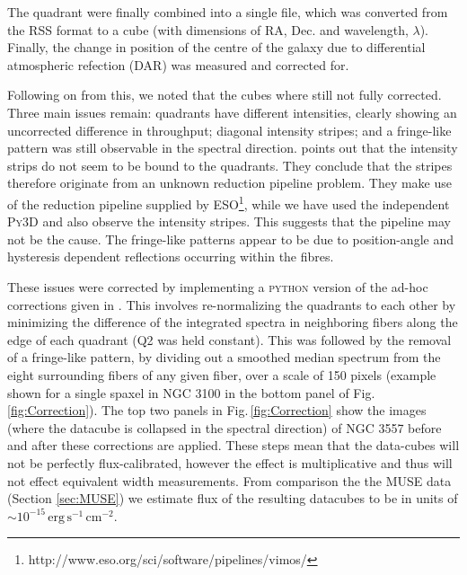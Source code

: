 		The quadrant were finally combined into a single file, which was converted from the RSS format to a cube (with dimensions of RA, Dec. and wavelength, $\lambda$). Finally, the change in position of the centre of the galaxy due to differential atmospheric refection (DAR) was measured and corrected for. 

		Following on from this, we noted that the cubes where still not fully corrected. Three main issues remain: quadrants have different intensities, clearly showing an uncorrected difference in throughput; diagonal intensity stripes; and a fringe-like pattern was still observable in the spectral direction. \citet{Lagerholm2012} points out that the intensity strips do not seem to be bound to the quadrants. They conclude that the stripes therefore originate from an unknown reduction pipeline problem. They make use of the reduction pipeline supplied by ESO\footnote{http://www.eso.org/sci/software/pipelines/vimos/}, while we have used the independent \textsc{Py3D} and also observe the intensity stripes. This suggests that the pipeline may not be the cause. The fringe-like patterns appear to be due to position-angle and hysteresis dependent reflections occurring within the fibres. 

		These issues were corrected by implementing a \textsc{python} version of the ad-hoc corrections given in \citet{Lagerholm2012}. This involves re-normalizing the quadrants to each other by minimizing the difference of the integrated spectra in neighboring fibers along the edge of each quadrant (Q2 was held constant). This was followed by the removal of a fringe-like pattern, by dividing out a smoothed median spectrum from the eight surrounding fibers of any given fiber, over a scale of 150 pixels (example shown for a single spaxel in NGC 3100 in the bottom panel of Fig.\,\ref{fig:Correction}). The top two panels in Fig.\,\ref{fig:Correction} show the images (where the datacube is collapsed in the spectral direction) of NGC 3557 before and after these corrections are applied. These steps mean that the data-cubes will not be perfectly flux-calibrated, however the effect is multiplicative and thus will not effect equivalent width measurements. From comparison the the MUSE data (Section \ref{sec:MUSE}) we estimate flux of the resulting datacubes to be in units of $\sim 10^{-15} \, \mathrm{erg\,s^{-1}\,cm^{-2}}$. 

